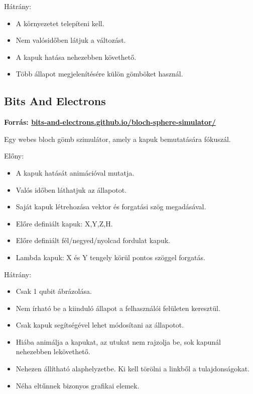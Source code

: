 \documentclass[fontsize=12pt,a4paper]{article}
\begin{document}
Hátrány:

\begin{itemize}
    \item A környezetet telepíteni kell.
    \item Nem valósidőben látjuk a változást.
    \item A kapuk hatása nehezebben követhető.
    \item Több állapot megjelenítésére külön gömböket használ.
\end{itemize}


\vspace{0.4cm}
\subsection{Bits And Electrons}
\textbf{Forrás: \href{https://bits-and-electrons.github.io/bloch-sphere-simulator/}{bits-and-electrons.github.io/bloch-sphere-simulator/}}

Egy webes bloch gömb szimulátor, amely a kapuk bemutatására fókuszál.

Előny:

\begin{itemize}
    \item A kapuk hatását animációval mutatja.
    \item Valós időben láthatjuk az állapotot.
    \item Saját kapuk létrehozása vektor és forgatási szög megadásával.
    \item Előre definiált kapuk: X,Y,Z,H.
    \item Előre definiált fél/negyed/nyolcad fordulat kapuk.
    \item Lambda kapuk: X és Y tengely körül pontos szöggel forgatás.
\end{itemize}

Hátrány:

\begin{itemize}
    \item Csak 1 qubit ábrázolása.
    \item Nem írható be a kiinduló állapot a felhasználói felületen keresztül.
    \item Csak kapuk segítségével lehet módosítani az állapotot.
    \item Hiába animálja a kapukat, az utukat nem rajzolja be, sok kapunál nehezebben lekövethető.
    \item Nehezen állítható alaphelyzetbe. Ki kell törölni a linkből a tulajdonságokat.
    \item Néha eltűnnek bizonyos grafikai elemek.
\end{itemize}
\end{document}
